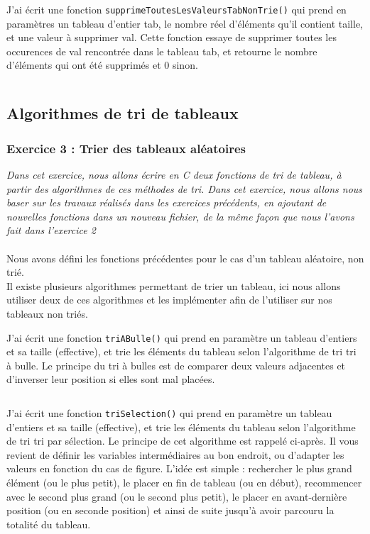 J'ai écrit une fonction \texttt{supprimeToutesLesValeursTabNonTrie()} qui prend en paramètres un tableau d’entier tab, le nombre réel d’éléments qu’il contient taille, et une valeur à supprimer val. Cette fonction essaye de supprimer toutes les occurences de val rencontrée dans le tableau tab, et retourne le nombre d’éléments qui ont été supprimés et 0 sinon.
\inputminted[linenos,firstline=29,lastline=35]{cpp}{../sources/cpp/TP1-2/modifTableauxNonTries.c}

\subsection{Algorithmes de tri de tableaux}
\subsubsection{Exercice 3 : Trier des tableaux aléatoires}
\textit{Dans cet exercice, nous allons écrire en C deux fonctions de tri de tableau, à partir des algorithmes de ces méthodes de tri. Dans cet exercice, nous allons nous baser sur les travaux réalisés dans les exercices précédents, en ajoutant de nouvelles fonctions dans un nouveau fichier, de la même façon que nous l’avons fait dans l’exercice 2}
\\\\
Nous avons défini les fonctions précédentes pour le cas d’un tableau aléatoire, non trié.\\
Il existe plusieurs algorithmes permettant de trier un tableau, ici nous allons utiliser deux de ces algorithmes et les implémenter afin de l'utiliser sur nos tableaux non triés.

J'ai écrit une fonction \texttt{triABulle()} qui prend en paramètre un tableau d’entiers et sa taille (effective), et trie les éléments du tableau selon l’algorithme de tri tri à bulle. Le principe du tri à bulles est de comparer deux valeurs adjacentes et d'inverser leur position si elles sont mal placées.
\inputminted[linenos,firstline=7,lastline=18]{cpp}{../sources/cpp/TP1-2/algosTri.c}

J'ai écrit une fonction \texttt{triSelection()} qui prend en paramètre un tableau d’entiers et sa taille (effective), et trie les éléments du tableau selon l’algorithme de tri tri par sélection. Le principe de cet algorithme est rappelé ci-après. Il vous revient de définir les variables intermédiaires au bon endroit, ou d’adapter les valeurs en fonction du cas de figure.
L'idée est simple : rechercher le plus grand élément (ou le plus petit), le placer en fin de tableau (ou en début), recommencer avec le second plus grand (ou le second plus petit), le placer en avant-dernière position (ou en seconde position) et ainsi de suite jusqu'à avoir parcouru la totalité du tableau.
\inputminted[linenos,firstline=20,lastline=31]{cpp}{../sources/cpp/TP1-2/algosTri.c}

